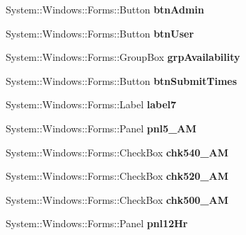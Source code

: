 \begin{DoxyCompactItemize}
System\+::\+Windows\+::\+Forms\+::\+Button {\bfseries btn\+Admin}
\item 
\mbox{\label{class_project1_1_1_my_form_a903b1574021e83505c4b84ed96f6352b}} 
System\+::\+Windows\+::\+Forms\+::\+Button {\bfseries btn\+User}
\item 
\mbox{\label{class_project1_1_1_my_form_aca1c3d56da8f98e6e885cca1abf7a7cf}} 
System\+::\+Windows\+::\+Forms\+::\+Group\+Box {\bfseries grp\+Availability}
\item 
\mbox{\label{class_project1_1_1_my_form_a7bbb88d20ea707fe1d4e21be6bbfe66f}} 
System\+::\+Windows\+::\+Forms\+::\+Button {\bfseries btn\+Submit\+Times}
\item 
\mbox{\label{class_project1_1_1_my_form_ac28700310263bb9a9938486fa785abbe}} 
System\+::\+Windows\+::\+Forms\+::\+Label {\bfseries label7}
\item 
\mbox{\label{class_project1_1_1_my_form_a477411dda16f66ecb31d7018a8b79add}} 
System\+::\+Windows\+::\+Forms\+::\+Panel {\bfseries pnl5\+\_\+AM}
\item 
\mbox{\label{class_project1_1_1_my_form_a98480fdf24e096b193312f006a60e566}} 
System\+::\+Windows\+::\+Forms\+::\+Check\+Box {\bfseries chk540\+\_\+AM}
\item 
\mbox{\label{class_project1_1_1_my_form_a4abe02613b143b5ee6ddad934841618f}} 
System\+::\+Windows\+::\+Forms\+::\+Check\+Box {\bfseries chk520\+\_\+AM}
\item 
\mbox{\label{class_project1_1_1_my_form_a44be76bf0e5c1950215f3e6f14887a97}} 
System\+::\+Windows\+::\+Forms\+::\+Check\+Box {\bfseries chk500\+\_\+AM}
\item 
\mbox{\label{class_project1_1_1_my_form_acd9906bce2932ecfc86a7227b9d74526}} 
System\+::\+Windows\+::\+Forms\+::\+Panel {\bfseries pnl12\+Hr}
\item 
\mbox{\label{class_project1_1_1_my_form_ad7f48538cb324b4c48bc877b613c17e7}} 

\end{DoxyCompactItemize}
